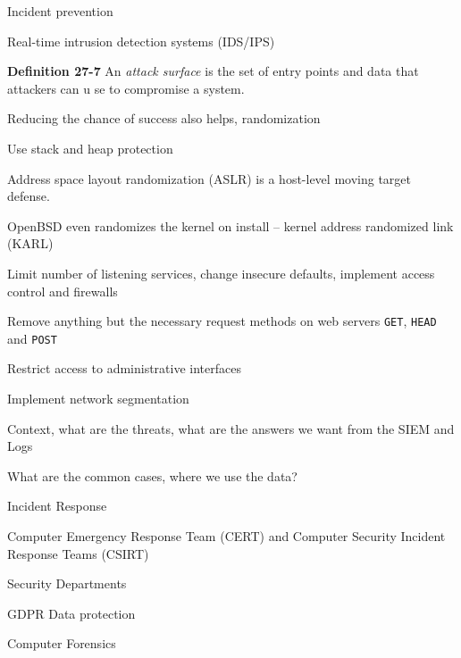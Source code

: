 \documentclass[Screen16to9,17pt]{foils}
\begin{document}
\begin{list2}
\item Incident prevention
\item Real-time intrusion detection systems (IDS/IPS)
\item {\bf Definition 27-7} An \emph{attack surface} is the set of entry points and data that attackers can u
se to compromise a system.
\item Reducing the chance of success also helps, randomization
\item Use stack and heap protection
\item Address space layout randomization (ASLR) is a host-level moving target defense.
\item OpenBSD even randomizes the kernel on install -- kernel address randomized link (KARL)
\item Limit number of listening services, change insecure defaults, implement access control and firewalls
\item Remove anything but the necessary request methods on web servers \verb+GET+, \verb+HEAD+ and \verb+POST+
\item Restrict access to administrative interfaces
\item Implement network segmentation
\end{list2}




\begin{list1}
\item Context, what are the threats, what are the answers we want from the SIEM and Logs

\item What are the common cases, where we use the data?

\begin{list2}
\item Incident Response
\item Computer Emergency Response Team (CERT) and Computer Security Incident Response Teams (CSIRT)
\item Security Departments
\item GDPR Data protection
\item Computer Forensics
\end{list2}

\end{list1}



\end{document}

